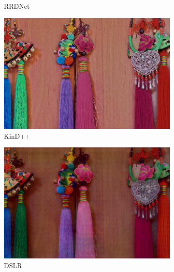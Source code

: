 \documentclass[a4paper]{ctexart}
\begin{document}
\begin{figure}[htb]
\begin{subfigure}{0.19\textwidth}
				\captionsetup{font=scriptsize}
				\caption{RRDNet}
				\label{fig: RRDNet1}
			\end{subfigure}
			\begin{subfigure}{0.19\textwidth}
				\includegraphics[width=\linewidth]{picture/LLIE/Experiment/KinD++1}
				\captionsetup{font=scriptsize}
				\caption{KinD++}
				\label{fig: KinD++1}	
			\end{subfigure}
			\begin{subfigure}{0.19\textwidth}
				\includegraphics[width=\linewidth]{picture/LLIE/Experiment/DSLR1}
				\captionsetup{font=scriptsize}
				\caption{DSLR}
				\label{fig: DSLR1}	
			\end{subfigure}\\
			\begin{subfigure}{0.19\textwidth}

\end{subfigure}
\end{figure}
\end{document}

